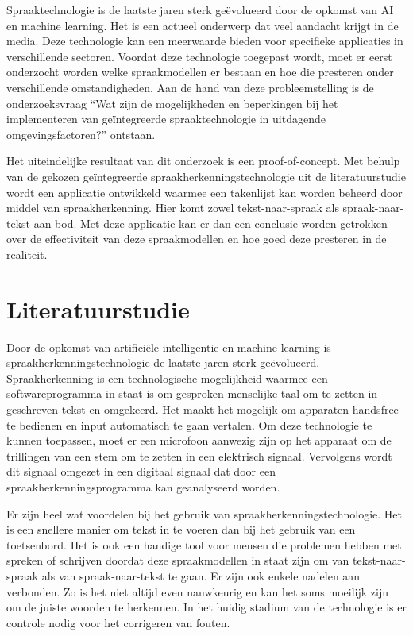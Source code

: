 Spraaktechnologie is de laatste jaren sterk geëvolueerd door de opkomst van AI en machine learning. Het is een actueel onderwerp dat veel aandacht krijgt in de media. Deze technologie kan een meerwaarde bieden voor specifieke applicaties in verschillende sectoren. Voordat deze technologie toegepast wordt, moet er eerst onderzocht worden welke spraakmodellen er bestaan en hoe die presteren onder verschillende omstandigheden. Aan de hand van deze probleemstelling is de onderzoeksvraag ``Wat zijn de mogelijkheden en beperkingen bij het implementeren van geïntegreerde spraaktechnologie in uitdagende omgevingsfactoren?'' ontstaan.

Het uiteindelijke resultaat van dit onderzoek is een proof-of-concept. Met behulp van de gekozen geïntegreerde spraakherkenningstechnologie uit de literatuurstudie wordt een applicatie ontwikkeld waarmee een takenlijst kan worden beheerd door middel van spraakherkenning. Hier komt zowel tekst-naar-spraak als spraak-naar-\\tekst aan bod. Met deze applicatie kan er dan een conclusie worden getrokken over de effectiviteit van deze spraakmodellen en hoe goed deze presteren in de realiteit. 



\section{Literatuurstudie}%
\label{sec:literatuurstudie}

Door de opkomst van artificiële intelligentie en machine learning is spraakherkenningstechnologie de laatste jaren sterk geëvolueerd. Spraakherkenning is een technologische mogelijkheid waarmee een softwareprogramma in staat is om gesproken menselijke taal om te zetten in geschreven tekst en omgekeerd. Het maakt het mogelijk om apparaten handsfree te bedienen en input automatisch te gaan vertalen. Om deze technologie te kunnen toepassen, moet er een microfoon aanwezig zijn op het apparaat om de trillingen van een stem om te zetten in een elektrisch signaal. Vervolgens wordt dit signaal omgezet in een digitaal signaal dat door een spraakherkenningsprogramma kan geanalyseerd worden.\autocite{Zwass2022}

Er zijn heel wat voordelen bij het gebruik van spraakherkenningstechnologie. Het is een snellere manier om tekst in te voeren dan bij het gebruik van een toetsenbord. Het is ook een handige tool voor mensen die problemen hebben met spreken of schrijven doordat deze spraakmodellen in staat zijn om van tekst-naar-spraak als van spraak-naar-tekst te gaan. Er zijn ook enkele nadelen aan verbonden. Zo is het niet altijd even nauwkeurig en kan het soms moeilijk zijn om de juiste woorden te herkennen. In het huidig stadium van de technologie is er controle nodig voor het corrigeren van fouten. \autocite{RingCentral2021}

